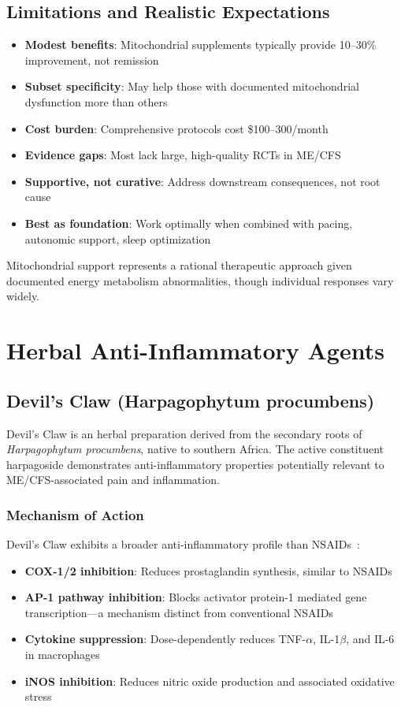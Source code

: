 \subsection{Limitations and Realistic Expectations}

\begin{itemize}
    \item \textbf{Modest benefits}: Mitochondrial supplements typically provide 10--30\% improvement, not remission
    \item \textbf{Subset specificity}: May help those with documented mitochondrial dysfunction more than others
    \item \textbf{Cost burden}: Comprehensive protocols cost \$100--300/month
    \item \textbf{Evidence gaps}: Most lack large, high-quality RCTs in ME/CFS
    \item \textbf{Supportive, not curative}: Address downstream consequences, not root cause
    \item \textbf{Best as foundation}: Work optimally when combined with pacing, autonomic support, sleep optimization
\end{itemize}

Mitochondrial support represents a rational therapeutic approach given documented energy metabolism abnormalities, though individual responses vary widely.

\section{Herbal Anti-Inflammatory Agents}
\label{sec:herbal-antiinflammatory}

\subsection{Devil's Claw (Harpagophytum procumbens)}

Devil's Claw is an herbal preparation derived from the secondary roots of \textit{Harpagophytum procumbens}, native to southern Africa. The active constituent harpagoside demonstrates anti-inflammatory properties potentially relevant to ME/CFS-associated pain and inflammation.

\subsubsection{Mechanism of Action}

Devil's Claw exhibits a broader anti-inflammatory profile than NSAIDs~\cite{Fiebich2012HarpagophytumAP1}:
\begin{itemize}
    \item \textbf{COX-1/2 inhibition}: Reduces prostaglandin synthesis, similar to NSAIDs
    \item \textbf{AP-1 pathway inhibition}: Blocks activator protein-1 mediated gene transcription---a mechanism distinct from conventional NSAIDs
    \item \textbf{Cytokine suppression}: Dose-dependently reduces TNF-$\alpha$, IL-1$\beta$, and IL-6 in macrophages
    \item \textbf{iNOS inhibition}: Reduces nitric oxide production and associated oxidative stress
\end{itemize}

